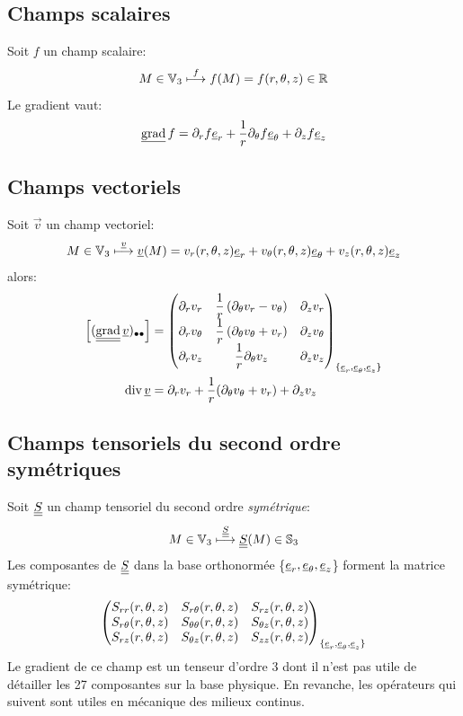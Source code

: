 \documentclass[10pt]{book}
\newcommand{\vgrad}{\vec{\text{grad}}\,}
\begin{document}
\begin{appendices}
\subsection{Champs scalaires}
Soit $f$ un champ scalaire:
$$M\in \mathbb{V}_{3}\overset{f}{\longmapsto}f(M)=f(r,\theta,z)\in \mathbb{R}$$
Le gradient vaut:
$$\vgrad f=\partial_{r}f\er+\frac{1}{r}\partial_{\theta}f\etheta+\partial_{z}f\ez$$
\subsection{Champs vectoriels}
Soit $\vec{v}$ un champ vectoriel:
$$M\in \mathbb{V}_{3}\overset{\underline{v}}{\longmapsto}\underline{v}(M)=v_{r}(r,\theta,z)\underline{e}_{r} +v_{\theta}(r,\theta,z)\underline{e}_{\theta}+v_{z}(r,\theta,z)\underline{e}_{z}$$
alors:
\begin{equation}
\begin{aligned}
\left[(\tgrad \vec{v})_{\bullet\bullet}\right]&=
\begin{pmatrix}
\partial_{r}v_{r} & \dfrac{1}{r}\left(\partial_{\theta}v_{r}-v_{\theta}\right) & \partial_{z}v_{r}\\
\partial_{r}v_{\theta}& \dfrac{1}{r}\left(\partial_{\theta}v_{\theta}+v_{r}\right)& \partial_{z}v_{\theta}\\
\partial_{r}v_{z}& \dfrac{1}{r}\partial_{\theta}v_{z} & \partial_{z}v_{z}\\
\end{pmatrix}_{\{\er,\etheta,\ez\}}
\\
\div\vec{v}&=\partial_{r}v_{r}+\frac{1}{r} (\partial_{\theta} \vtheta+v_{r})+\partial_{z}v_{z}
\end{aligned}
\label{eq:formulaire_grad_cyl_vec}
\end{equation}
\subsection{Champs tensoriels du second ordre symétriques}
Soit $\underline{\underline{S}}$ un champ tensoriel du second ordre \emph{symétrique}:
$$M\in \mathbb{V}_{3}\overset{\underline{\underline{S}}}{\longmapsto} \underline{\underline{S}}(M)\in \mathbb{S}_{3}$$
Les composantes de $\underline{\underline{S}}$ dans la base orthonormée \{$\underline{e}_{r},\underline{e}_{\theta}, \underline{e}_{z}$\} forment la matrice symétrique:
$$\begin{pmatrix}
S_{rr}(r,\theta,z) & S_{r\theta}(r,\theta,z) & S_{rz}(r,\theta,z)\\
S_{r\theta}(r,\theta,z) & S_{\theta\theta}(r,\theta,z) & S_{\theta z}(r,\theta,z)\\
S_{rz}(r,\theta,z) & S_{\theta z}(r,\theta,z) & S_{zz}(r,\theta,z)
\end{pmatrix}_{\{\underline{e}_{r},\underline{e}_{\theta},\underline{e}_{z}\}}$$
Le gradient de ce champ est un tenseur d'ordre 3 dont il n'est pas utile de détailler les 27 composantes sur la base physique. En revanche, les opérateurs qui suivent sont utiles en mécanique des milieux continus.\\


\end{appendices}
\end{document}
